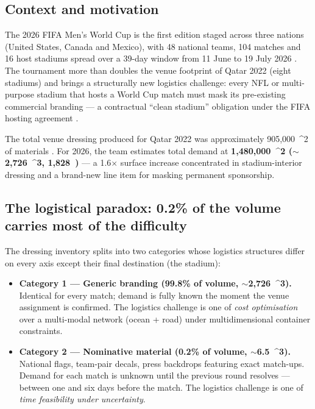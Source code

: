\documentclass[11pt,a4paper]{article}
\numberwithin{equation}{section}
\newcommand{\mcube}{\text{m}^{3}}
\newcommand{\msq}{\text{m}^{2}}
\newcommand{\tonne}{\text{t}}
\begin{document}
\subsection{Context and motivation}

The 2026 FIFA Men's World Cup is the first edition staged across three nations (United States, Canada and Mexico), with 48 national teams, 104 matches and 16 host stadiums spread over a 39-day window from 11 June to 19 July 2026 \cite{fifa2026official}. The tournament more than doubles the venue footprint of Qatar 2022 (eight stadiums) and brings a structurally new logistics challenge: every NFL or multi-purpose stadium that hosts a World Cup match must mask its pre-existing commercial branding — a contractual ``clean stadium'' obligation under the FIFA hosting agreement \cite{themirror_scrubbing}.

The total venue dressing produced for Qatar 2022 was approximately 905{,}000~\msq{} of materials \cite{thelookcompany_qatar}. For 2026, the team estimates total demand at \textbf{1{,}480{,}000~\msq{} ($\sim$2{,}726~\mcube{}, 1{,}828~\tonne{})} — a 1.6$\times$ surface increase concentrated in stadium-interior dressing and a brand-new line item for masking permanent sponsorship.

\subsection{The logistical paradox: 0.2\% of the volume carries most of the difficulty}

The dressing inventory splits into two categories whose logistics structures differ on every axis except their final destination (the stadium):

\begin{itemize}[leftmargin=*,itemsep=3pt,topsep=2pt]
\item \textbf{Category 1 — Generic branding (99.8\% of volume, $\sim$2{,}726~\mcube).} Identical for every match; demand is fully known the moment the venue assignment is confirmed. The logistics challenge is one of \emph{cost optimisation} over a multi-modal network (ocean + road) under multidimensional container constraints.
\item \textbf{Category 2 — Nominative material (0.2\% of volume, $\sim$6.5~\mcube).} National flags, team-pair decals, press backdrops featuring exact match-ups. Demand for each match is unknown until the previous round resolves — between one and six days before the match. The logistics challenge is one of \emph{time feasibility under uncertainty}.
\end{itemize}
\end{document}

